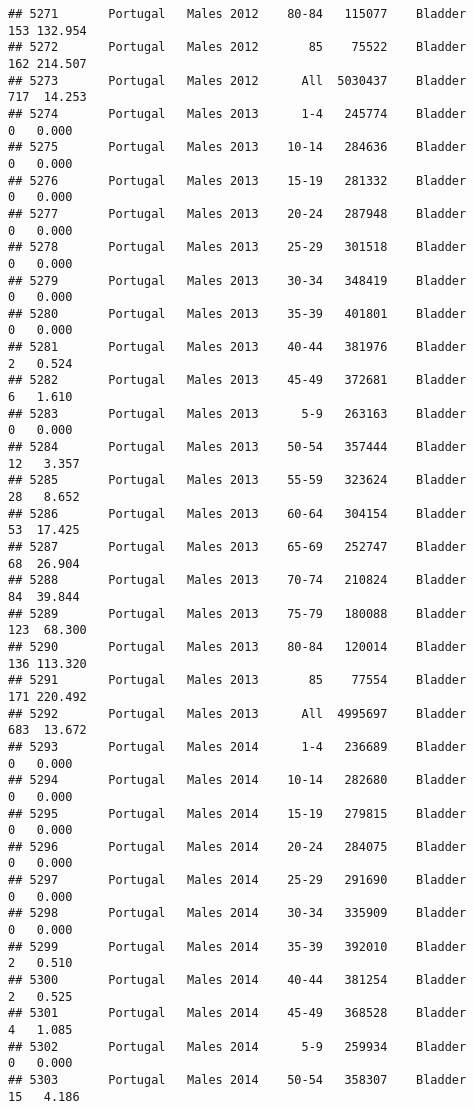 \documentclass[
]{article}
\begin{document}
\begin{verbatim}
## 5271       Portugal   Males 2012    80-84   115077    Bladder    153 132.954
## 5272       Portugal   Males 2012       85    75522    Bladder    162 214.507
## 5273       Portugal   Males 2012      All  5030437    Bladder    717  14.253
## 5274       Portugal   Males 2013      1-4   245774    Bladder      0   0.000
## 5275       Portugal   Males 2013    10-14   284636    Bladder      0   0.000
## 5276       Portugal   Males 2013    15-19   281332    Bladder      0   0.000
## 5277       Portugal   Males 2013    20-24   287948    Bladder      0   0.000
## 5278       Portugal   Males 2013    25-29   301518    Bladder      0   0.000
## 5279       Portugal   Males 2013    30-34   348419    Bladder      0   0.000
## 5280       Portugal   Males 2013    35-39   401801    Bladder      0   0.000
## 5281       Portugal   Males 2013    40-44   381976    Bladder      2   0.524
## 5282       Portugal   Males 2013    45-49   372681    Bladder      6   1.610
## 5283       Portugal   Males 2013      5-9   263163    Bladder      0   0.000
## 5284       Portugal   Males 2013    50-54   357444    Bladder     12   3.357
## 5285       Portugal   Males 2013    55-59   323624    Bladder     28   8.652
## 5286       Portugal   Males 2013    60-64   304154    Bladder     53  17.425
## 5287       Portugal   Males 2013    65-69   252747    Bladder     68  26.904
## 5288       Portugal   Males 2013    70-74   210824    Bladder     84  39.844
## 5289       Portugal   Males 2013    75-79   180088    Bladder    123  68.300
## 5290       Portugal   Males 2013    80-84   120014    Bladder    136 113.320
## 5291       Portugal   Males 2013       85    77554    Bladder    171 220.492
## 5292       Portugal   Males 2013      All  4995697    Bladder    683  13.672
## 5293       Portugal   Males 2014      1-4   236689    Bladder      0   0.000
## 5294       Portugal   Males 2014    10-14   282680    Bladder      0   0.000
## 5295       Portugal   Males 2014    15-19   279815    Bladder      0   0.000
## 5296       Portugal   Males 2014    20-24   284075    Bladder      0   0.000
## 5297       Portugal   Males 2014    25-29   291690    Bladder      0   0.000
## 5298       Portugal   Males 2014    30-34   335909    Bladder      0   0.000
## 5299       Portugal   Males 2014    35-39   392010    Bladder      2   0.510
## 5300       Portugal   Males 2014    40-44   381254    Bladder      2   0.525
## 5301       Portugal   Males 2014    45-49   368528    Bladder      4   1.085
## 5302       Portugal   Males 2014      5-9   259934    Bladder      0   0.000
## 5303       Portugal   Males 2014    50-54   358307    Bladder     15   4.186

\end{verbatim}
\end{document}
